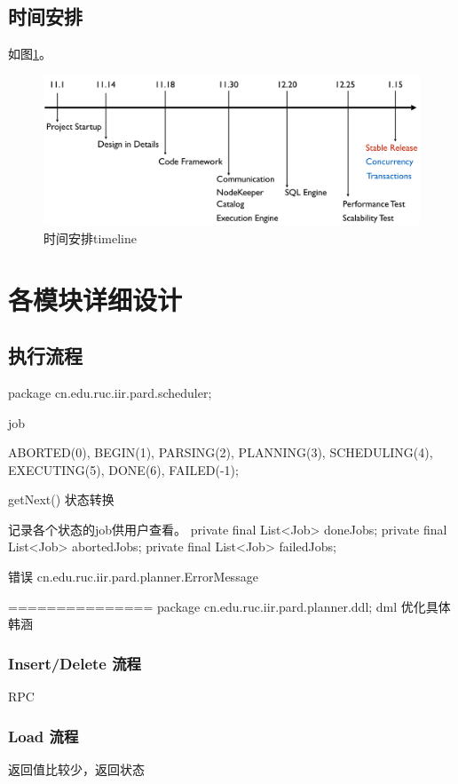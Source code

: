 \documentclass[a4paper, 12pt]{ctexart}
\begin{document}
\subsection{时间安排}
如图\ref{fig:tl}。

\begin{figure}[htbp]
	\centering
	\includegraphics[width=\linewidth]{figure/timeline.png}
	\caption{时间安排timeline}
	\label{fig:tl}
\end{figure}

\section{各模块详细设计}
\subsection{执行流程}
package cn.edu.ruc.iir.pard.scheduler;

job 

ABORTED(0), BEGIN(1), PARSING(2), PLANNING(3), SCHEDULING(4), EXECUTING(5), DONE(6), FAILED(-1);


getNext() 状态转换



记录各个状态的job供用户查看。
private final List<Job> doneJobs;
private final List<Job> abortedJobs;
private final List<Job> failedJobs;


错误
cn.edu.ruc.iir.pard.planner.ErrorMessage



=============== 
package cn.edu.ruc.iir.pard.planner.ddl;
dml  优化具体 韩涵

\subsubsection{Insert/Delete 流程}
RPC

\subsubsection{Load 流程}
返回值比较少，返回状态
\end{document}
